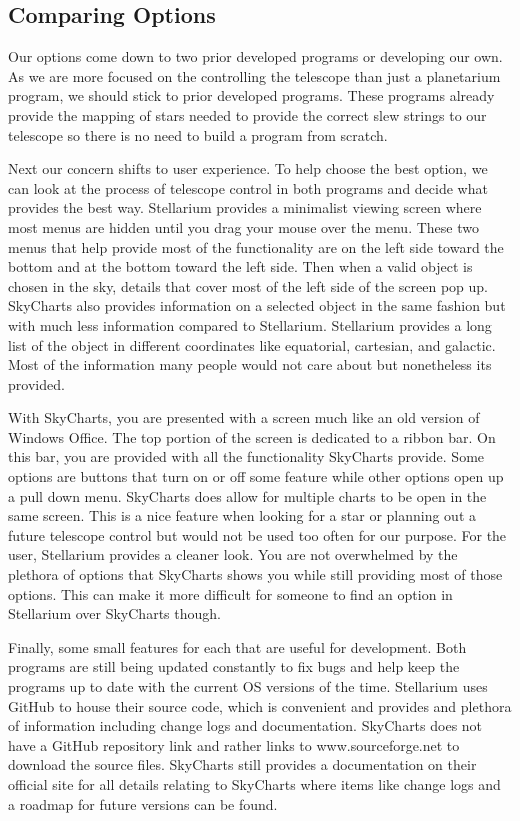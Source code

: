 \documentclass[12pt]{report}
\begin{document}
\subsection*{Comparing Options}

Our options come down to two prior developed programs or developing our own. As we are more focused on the controlling the telescope than just a planetarium program, we should stick to prior developed programs. These programs already provide the mapping of stars needed to provide the correct slew strings to our telescope so there is no need to build a program from scratch.

Next our concern shifts to user experience. To help choose the best option, we can look at the process of telescope control in both programs and decide what provides the best way. Stellarium provides a minimalist viewing screen where most menus are hidden until you drag your mouse over the menu. These two menus that help provide most of the functionality are on the left side toward the bottom and at the bottom toward the left side. Then when a valid object is chosen in the sky, details that cover most of the left side of the screen pop up. SkyCharts also provides information on a selected object in the same fashion but with much less information compared to Stellarium. Stellarium provides a long list of the object in different coordinates like equatorial, cartesian, and galactic. Most of the information many people would not care about but nonetheless its provided.

With SkyCharts, you are presented with a screen much like an old version of Windows Office. The top portion of the screen is dedicated to a ribbon bar. On this bar, you are provided with all the functionality SkyCharts provide. Some options are buttons that turn on or off some feature while other options open up a pull down menu. SkyCharts does allow for multiple charts to be open in the same screen. This is a nice feature when looking for a star or planning out a future telescope control but would not be used too often for our purpose. For the user, Stellarium provides a cleaner look. You are not overwhelmed by the plethora of options that SkyCharts shows you while still providing most of those options. This can make it more difficult for someone to find an option in Stellarium over SkyCharts though.

Finally, some small features for each that are useful for development. Both programs are still being updated constantly to fix bugs and help keep the programs up to date with the current OS versions of the time. Stellarium uses GitHub to house their source code, which is convenient and provides and plethora of information including change logs and documentation. SkyCharts does not have a GitHub repository link and rather links to www.sourceforge.net to download the source files. SkyCharts still provides a documentation on their official site for all details relating to SkyCharts where items like change logs and a roadmap for future versions can be found.
\end{document}

